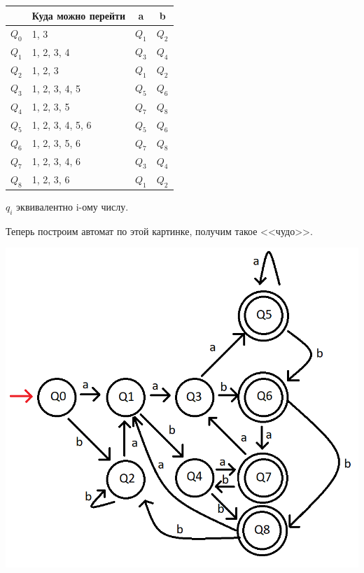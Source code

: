 \documentclass[a4paper,14pt]{article} %
\begin{document}
    \begin{tabular}{|l|l|l|l|}
    \hline
     & Куда можно перейти & \multicolumn{1}{c|}{a} & \multicolumn{1}{c|}{b} \\ \hline
     $Q_0$ & 1, 3               &  $Q_1$  &  $Q_2$                      \\ \hline
     $Q_1$ & 1, 2, 3, 4         &  $Q_3$  &  $Q_4$                      \\ \hline
     $Q_2$ & 1, 2, 3            &  $Q_1$  &  $Q_2$                      \\ \hline
     $Q_3$ & 1, 2, 3, 4, 5      &  $Q_5$  &  $Q_6$                      \\ \hline
     $Q_4$ & 1, 2, 3, 5         &  $Q_7$  &  $Q_8$                      \\ \hline
     $Q_5$ & 1, 2, 3, 4, 5, 6   &  $Q_5$  &  $Q_6$                      \\ \hline
     $Q_6$ & 1, 2, 3, 5, 6      &  $Q_7$  &  $Q_8$                      \\ \hline
     $Q_7$ & 1, 2, 3, 4, 6      &  $Q_3$  &  $Q_4$                      \\ \hline
     $Q_8$ & 1, 2, 3, 6         &  $Q_1$  &  $Q_2$                      \\ \hline
    \end{tabular}
    $q_i$ эквивалентно i-ому числу.


    Теперь построим автомат по этой картинке, получим такое <<чудо>>.

    \includegraphics[scale=0.84]{08.png}
\end{document}
